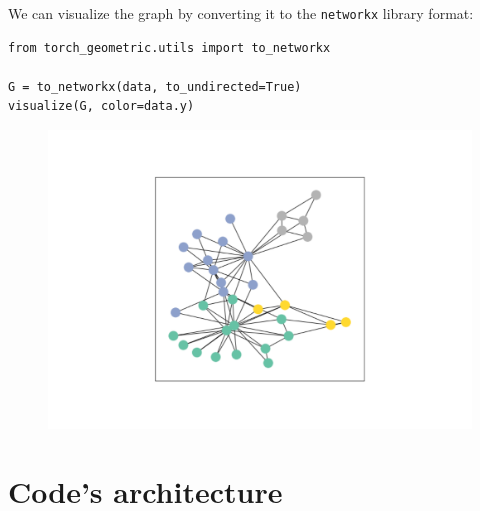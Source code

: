 \documentclass[12pt,a4paper]{report}
\theoremstyle{definition}
\begin{document}
We can visualize the graph by converting it to the \lstinline{networkx} library format:
\begin{lstlisting}
from torch_geometric.utils import to_networkx

G = to_networkx(data, to_undirected=True)
visualize(G, color=data.y)
\end{lstlisting}
\begin{figure}[h]
    \includegraphics[width = 0.5 \textwidth, trim={4.5cm 2.2cm 4.5cm 2.2cm}, clip]{Images/zachary_py.pdf}
\end{figure}

\section{Code's architecture}
\label{sec:code_arch}
\end{document}
